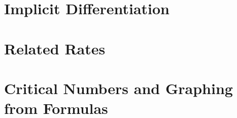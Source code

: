 \documentclass[12pt,]{book}
\theoremstyle{plain}
\theoremstyle{definition}
\numberwithin{equation}{section}
\begin{document}
\chapter[Implicit Differentiation]{Implicit Differentiation}\label{chapter-implicit-differentiation}
\typeout{************************************************}
\typeout{************************************************}
\chapter[Related Rates]{Related Rates}\label{chapter-related-rates}
\typeout{************************************************}
\typeout{************************************************}
\chapter[Critical Numbers and Graphing from Formulas]{Critical Numbers and Graphing from Formulas}\label{chapter-critical-numbers-graphing-from-formulas}
%
\backmatter
%
\end{document}
